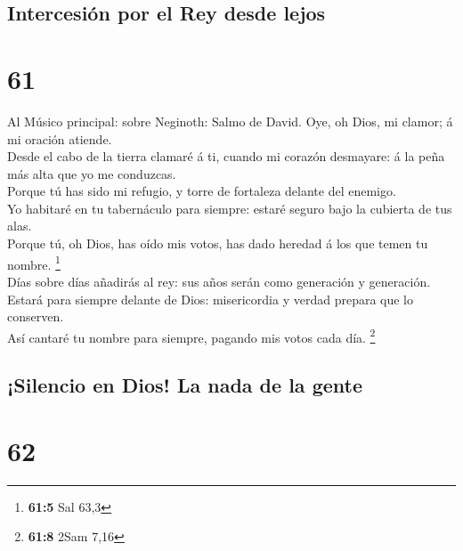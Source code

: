 \hypertarget{intercesiuxf3n-por-el-rey-desde-lejos}{%
\subsection{Intercesión por el Rey desde
lejos}\label{intercesiuxf3n-por-el-rey-desde-lejos}}

\hypertarget{section-60}{%
\section{61}\label{section-60}}

 Al Músico principal: sobre Neginoth: Salmo de David. Oye,
oh Dios, mi clamor; á mi oración atiende.\\
 Desde el cabo de la tierra clamaré á ti, cuando mi
corazón desmayare: á la peña más alta que yo me conduzcas.\\
 Porque tú has sido mi refugio, y torre de fortaleza
delante del enemigo.\\
 Yo habitaré en tu tabernáculo para siempre: estaré seguro
bajo la cubierta de tus alas.\\
 Porque tú, oh Dios, has oído mis votos, has dado heredad
á los que temen tu nombre. \footnote{\textbf{61:5} Sal 63,3}\\
 Días sobre días añadirás al rey: sus años serán como
generación y generación.\\
 Estará para siempre delante de Dios: misericordia y
verdad prepara que lo conserven.\\
 Así cantaré tu nombre para siempre, pagando mis votos
cada día. \footnote{\textbf{61:8} 2Sam 7,16}

\hypertarget{silencio-en-dios-la-nada-de-la-gente}{%
\subsection{¡Silencio en Dios! La nada de la
gente}\label{silencio-en-dios-la-nada-de-la-gente}}

\hypertarget{section-61}{%
\section{62}\label{section-61}}

